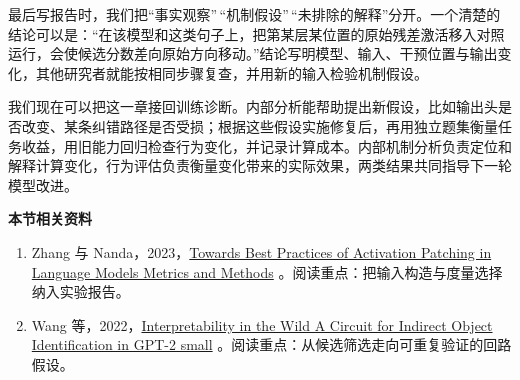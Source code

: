最后写报告时，我们把``事实观察''\,``机制假设''\,``未排除的解释''分开。一个清楚的结论可以是：``在该模型和这类句子上，把第某层某位置的原始残差激活移入对照运行，会使候选分数差向原始方向移动。''结论写明模型、输入、干预位置与输出变化，其他研究者就能按相同步骤复查，并用新的输入检验机制假设。

我们现在可以把这一章接回训练诊断。内部分析能帮助提出新假设，比如输出头是否改变、某条纠错路径是否受损；根据这些假设实施修复后，再用独立题集衡量任务收益，用旧能力回归检查行为变化，并记录计算成本。内部机制分析负责定位和解释计算变化，行为评估负责衡量变化带来的实际效果，两类结果共同指导下一轮模型改进。

\textbf{本节相关资料}
\begin{enumerate}
    \item Zhang 与 Nanda，2023，\href{https://arxiv.org/abs/2309.16042}{Towards Best Practices of Activation Patching in Language Models Metrics and Methods} 。阅读重点：把输入构造与度量选择纳入实验报告。
    \item Wang 等，2022，\href{https://arxiv.org/abs/2211.00593}{Interpretability in the Wild A Circuit for Indirect Object Identification in GPT-2 small} 。阅读重点：从候选筛选走向可重复验证的回路假设。
\end{enumerate}
